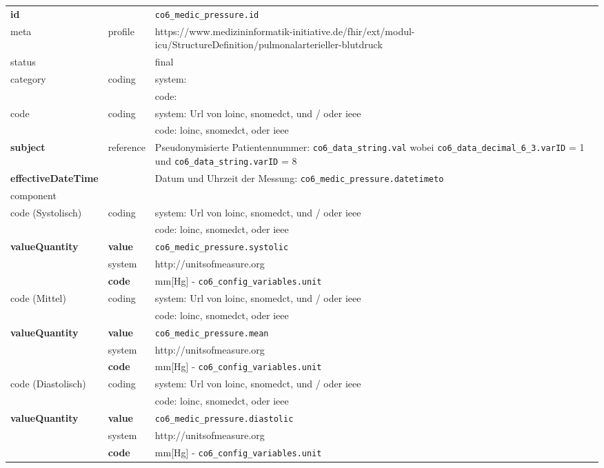 \begin{longtable}{|l|l|p{7.5cm}|}
        \hline
        \rowcolor{lightgray} \multicolumn{3}{|l|}{Data Mapping (inhaltlich)} \\ \hline
        \textbf{id} &  & \texttt{co6\_medic\_pressure.id} \\ \hline
	meta & profile & https://www.medizininformatik-initiative.de/fhir/ext/modul-icu/StructureDefinition/pulmonalarterieller-blutdruck \\ \hline 
	status & & final  \\ \hline 
	category & coding & system:  \\ 
\cline{3-3}
        & & code:  \\ \hline
        code & coding & system: Url von \ac{loinc}, \ac{snomedct}, und / oder \ac{ieee} \\
        \cline{3-3}
         & & code: \ac{loinc}, \ac{snomedct}, oder \ac{ieee} \\ \hline
        \textbf{subject} & reference & Pseudonymisierte Patientennummer: \texttt{co6\_data\_string.val} wobei \texttt{co6\_data\_decimal\_6\_3.varID} = 1 und \texttt{co6\_data\_string.varID} = 8 \\ \hline
        \textbf{effectiveDateTime} & & Datum und Uhrzeit der Messung:  \texttt{co6\_medic\_pressure.datetimeto} \\ \hline
	\multicolumn{3}{|l|}{component} \\ \hline
	code (Systolisch)  & coding & system: Url von \ac{loinc}, \ac{snomedct}, und / oder \ac{ieee} \\ 
	\cline{3-3} 
	&  & code: \ac{loinc}, \ac{snomedct}, oder \ac{ieee} \\ \hline	
	\textbf{valueQuantity} & \textbf{value} & \texttt{co6\_medic\_pressure.systolic} \\
	\cline{2-3}
	& system & http://unitsofmeasure.org \\ 
	\cline{2-3}
	& \textbf{code} & mm[Hg] - \texttt{co6\_config\_variables.unit} \\ \hline
	code (Mittel)  & coding & system: Url von \ac{loinc}, \ac{snomedct}, und / oder \ac{ieee} \\ 
	\cline{3-3} 
	&  & code: \ac{loinc}, \ac{snomedct}, oder \ac{ieee} \\ \hline	
	\textbf{valueQuantity} & \textbf{value} & \texttt{co6\_medic\_pressure.mean} \\
	\cline{2-3}
	& system & http://unitsofmeasure.org \\ 
	\cline{2-3}
	& \textbf{code} &  mm[Hg] - \texttt{co6\_config\_variables.unit} \\ \hline
	code (Diastolisch)  & coding & system: Url von \ac{loinc}, \ac{snomedct}, und / oder \ac{ieee} \\ 
	\cline{3-3} 
	&  & code: \ac{loinc}, \ac{snomedct}, oder \ac{ieee} \\ \hline	
	\textbf{valueQuantity} & \textbf{value} & \texttt{co6\_medic\_pressure.diastolic} \\
	\cline{2-3}
	& system & http://unitsofmeasure.org \\ 
	\cline{2-3}
	& \textbf{code} & mm[Hg] - \texttt{co6\_config\_variables.unit} \\ \hline
\end{longtable}
